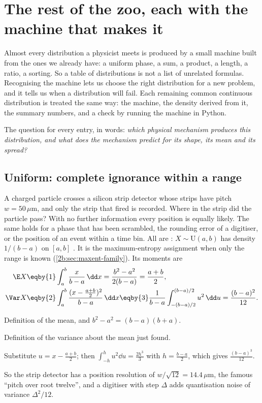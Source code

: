 \section{The rest of the zoo, each with the machine that makes it}
\label{2b:sec:zoo}

Almost every distribution a physicist meets is produced by a small machine built from the ones we already have: a uniform phase, a sum, a product, a length, a ratio, a sorting. So a table of distributions is not a list of unrelated formulas. Recognising the machine lets us choose the right distribution for a new problem, and it tells us when a distribution will fail. Each remaining common continuous distribution is treated the same way: the machine, the density derived from it, the summary numbers, and a check by running the machine in Python.

The question for every entry, in words: \emph{which physical mechanism produces this distribution, and what does the mechanism predict for its shape, its mean and its spread?}

\subsection{Uniform: complete ignorance within a range}
\label{2b:sec:uniform}

A charged particle crosses a silicon strip detector whose strips have pitch $w=50\,\mu$m, and only the strip that fired is recorded. Where in the strip did the particle pass? With no further information every position is equally likely. The same holds for a phase that has been scrambled, the rounding error of a digitiser, or the position of an event within a time bin. All are : $X\sim\mathrm U(a,b)$ has density $1/(b-a)$ on $[a,b]$ . It is the maximum-entropy assignment when only the range is known (\cref{2b:sec:maxent-family}). Its moments are
\begin{align}
  \E X&\eqby{1}\int_a^b\frac{x}{b-a}\,\dd x=\frac{b^2-a^2}{2(b-a)}=\frac{a+b}{2}, \nonumber\\
  \Var X&\eqby{2}\int_a^b\frac{(x-\frac{a+b}2)^2}{b-a}\,\dd x
   \eqby{3}\frac{1}{b-a}\int_{-(b-a)/2}^{(b-a)/2}u^2\,\dd u=\frac{(b-a)^2}{12} .
  \label{2b:eq:uniform}
\end{align}
\begin{explain}
  \item Definition of the mean, and $b^2-a^2=(b-a)(b+a)$.
  \item Definition of the variance about the mean just found.
  \item Substitute $u=x-\frac{a+b}{2}$; then $\int_{-h}^hu^2\dd u=\frac{2h^3}{3}$ with $h=\frac{b-a}2$, which gives $\frac{(b-a)^3}{12}$.
\end{explain}
So the strip detector has a position resolution of $w/\sqrt{12}=14.4\,\mu$m, the famous ``pitch over root twelve'', and a digitiser with step $\Delta$ adds quantisation noise of variance $\Delta^2/12$.

